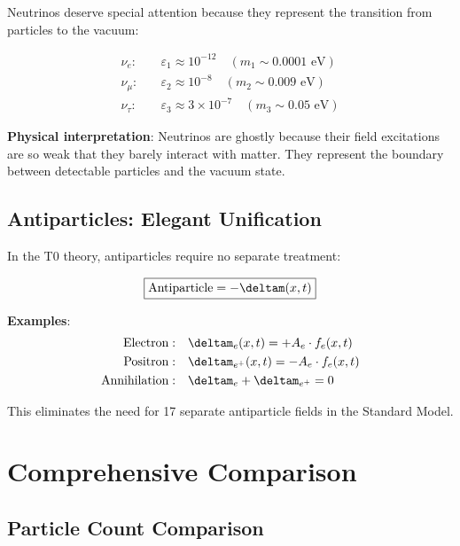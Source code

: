 	Neutrinos deserve special attention because they represent the transition from particles to the vacuum:
	
	\begin{equation}
		\begin{aligned}
			\nu_e: \quad &\varepsilon_1 \approx 10^{-12} \quad (m_1 \sim 0.0001 \text{ eV}) \\
			\nu_\mu: \quad &\varepsilon_2 \approx 10^{-8} \quad (m_2 \sim 0.009 \text{ eV}) \\
			\nu_\tau: \quad &\varepsilon_3 \approx 3 \times 10^{-7} \quad (m_3 \sim 0.05 \text{ eV})
		\end{aligned}
		\label{eq:neutrino_spectrum}
	\end{equation}
	
	\textbf{Physical interpretation}: Neutrinos are ghostly because their field excitations are so weak that they barely interact with matter. They represent the boundary between detectable particles and the vacuum state.
	
	\subsection{Antiparticles: Elegant Unification}
	
	In the T0 theory, antiparticles require no separate treatment:
	
	\begin{equation}
		\boxed{\text{Antiparticle} = -\deltam(x,t)}
		\label{eq:antiparticle_unification}
	\end{equation}
	
	\textbf{Examples}:
	\begin{align}
		\text{Electron}: \quad &\deltam_e(x,t) = +A_e \cdot f_e(x,t) \\
		\text{Positron}: \quad &\deltam_{e^+}(x,t) = -A_e \cdot f_e(x,t) \\
		\text{Annihilation}: \quad &\deltam_e + \deltam_{e^+} = 0
	\end{align}
	
	This eliminates the need for 17 separate antiparticle fields in the Standard Model.
	
	\section{Comprehensive Comparison}
	
	\subsection{Particle Count Comparison}
	
